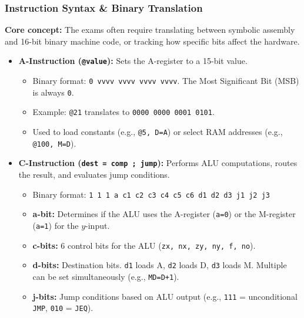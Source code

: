 \documentclass[12pt,a4paper]{article}
\begin{document}
\subsubsection*{Instruction Syntax \& Binary Translation}
\textbf{Core concept:} The exams often require translating between symbolic assembly and 16-bit binary machine code, or tracking how specific bits affect the hardware.
\begin{itemize}
    \item \textbf{A-Instruction (\texttt{@value}):} Sets the A-register to a 15-bit value. 
    \begin{itemize}
        \item Binary format: \texttt{0 vvvv vvvv vvvv vvvv}. The Most Significant Bit (MSB) is always \texttt{0}.
        \item Example: \texttt{@21} translates to \texttt{0000 0000 0001 0101}.
        \item Used to load constants (e.g., \texttt{@5, D=A}) or select RAM addresses (e.g., \texttt{@100, M=D}).
    \end{itemize}
    \item \textbf{C-Instruction (\texttt{dest = comp ; jump}):} Performs ALU computations, routes the result, and evaluates jump conditions.
    \begin{itemize}
        \item Binary format: \texttt{1 1 1 a c1 c2 c3 c4 c5 c6 d1 d2 d3 j1 j2 j3}
        \item \textbf{a-bit:} Determines if the ALU uses the A-register (\texttt{a=0}) or the M-register (\texttt{a=1}) for the $y$-input.
        \item \textbf{c-bits:} 6 control bits for the ALU (\texttt{zx, nx, zy, ny, f, no}).
        \item \textbf{d-bits:} Destination bits. \texttt{d1} loads A, \texttt{d2} loads D, \texttt{d3} loads M. Multiple can be set simultaneously (e.g., \texttt{MD=D+1}).
        \item \textbf{j-bits:} Jump conditions based on ALU output (e.g., \texttt{111} = unconditional \texttt{JMP}, \texttt{010} = \texttt{JEQ}).
    \end{itemize}
\end{itemize}
\end{document}
